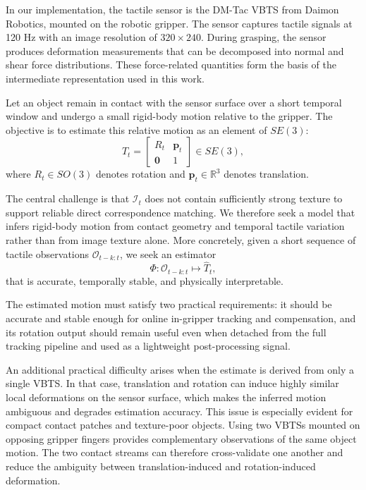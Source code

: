 \documentclass[letterpaper,10pt,journal,twoside]{IEEEtran}
\begin{document}
In our implementation, the tactile sensor is the DM-Tac VBTS from Daimon Robotics, mounted on the robotic gripper. The sensor captures tactile signals at 120 Hz with an image resolution of $320 \times 240$. During grasping, the sensor produces deformation measurements that can be decomposed into normal and shear force distributions. These force-related quantities form the basis of the intermediate representation used in this work.

Let an object remain in contact with the sensor surface over a short temporal window and undergo a small rigid-body motion relative to the gripper. The objective is to estimate this relative motion as an element of $SE(3)$:
\begin{equation}
T_t =
\begin{bmatrix}
R_t & \mathbf{p}_t \\
\mathbf{0} & 1
\end{bmatrix}
\in SE(3),
\end{equation}
where $R_t \in SO(3)$ denotes rotation and $\mathbf{p}_t \in \mathbb{R}^3$ denotes translation.

The central challenge is that $\mathcal{I}_t$ does not contain sufficiently strong texture to support reliable direct correspondence matching. We therefore seek a model that infers rigid-body motion from contact geometry and temporal tactile variation rather than from image texture alone. More concretely, given a short sequence of tactile observations $\mathcal{O}_{t-k:t}$, we seek an estimator
\begin{equation}
\Phi: \mathcal{O}_{t-k:t} \mapsto \hat{T}_t,
\end{equation}
that is accurate, temporally stable, and physically interpretable.

The estimated motion must satisfy two practical requirements: it should be accurate and stable enough for online in-gripper tracking and compensation, and its rotation output should remain useful even when detached from the full tracking pipeline and used as a lightweight post-processing signal.

An additional practical difficulty arises when the estimate is derived from only a single VBTS. In that case, translation and rotation can induce highly similar local deformations on the sensor surface, which makes the inferred motion ambiguous and degrades estimation accuracy. This issue is especially evident for compact contact patches and texture-poor objects. Using two VBTSs mounted on opposing gripper fingers provides complementary observations of the same object motion. The two contact streams can therefore cross-validate one another and reduce the ambiguity between translation-induced and rotation-induced deformation.
\end{document}
